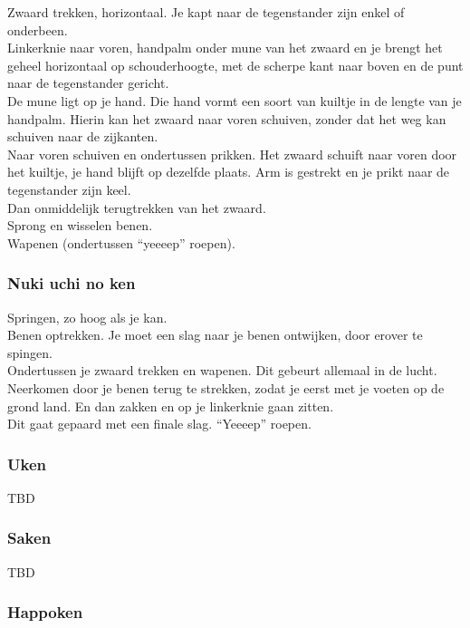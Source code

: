\suwaristart
Zwaard trekken, horizontaal. Je kapt naar de tegenstander zijn enkel of onderbeen.\\
Linkerknie naar voren, handpalm onder mune van het zwaard en je brengt het geheel horizontaal op schouderhoogte, met de scherpe kant naar boven en de punt naar de tegenstander gericht.\\
De mune ligt op je hand. Die hand vormt een soort van kuiltje in de lengte van je handpalm. Hierin kan het zwaard naar voren schuiven, zonder dat het weg kan schuiven naar de zijkanten.\\
Naar voren schuiven en ondertussen prikken. Het zwaard schuift naar voren door het kuiltje, je hand blijft op dezelfde plaats. Arm is gestrekt en je prikt naar de tegenstander zijn keel.\\
Dan onmiddelijk terugtrekken van het zwaard.\\
Sprong en wisselen benen.\\
Wapenen (ondertussen ``yeeeep'' roepen).\\
\suwaristop

\subsubsection{Nuki uchi no ken}

\suwaristart
Springen, zo hoog als je kan.\\
Benen optrekken. Je moet een slag naar je benen ontwijken, door erover te spingen.\\
Ondertussen je zwaard trekken en wapenen. Dit gebeurt allemaal in de lucht.\\
Neerkomen door je benen terug te strekken, zodat je eerst met je voeten op de grond land. En dan zakken en op je linkerknie gaan zitten.\\
Dit gaat gepaard met een finale slag. ``Yeeeep'' roepen.\\
\suwaristop

\subsubsection{Uken}

\suwaristart
TBD

\subsubsection{Saken}

\suwaristart
TBD

\subsubsection{Happoken}

